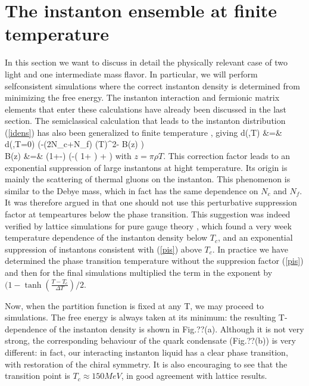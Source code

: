 \section{The instanton ensemble at finite temperature}

  In this section we want to discuss in detail the physically
relevant case of two light and one intermediate mass flavor. In
particular, we will perform selfconsistent simulations where the
correct instanton density is determined from minimizing the free
energy. The instanton interaction and fermionic matrix elements
that enter these calculations have already been discussed in the
last section. The semiclassical calculation that leads to the
instanton distribution (\ref{idens}) has also been generalized to
finite temperature \cite{PY_80}, giving
\be
\label{pis}
  d(\rho,T) &=& d(\rho,T=0) \exp(-(2N_c+N_f)
    (\pi\rho T)^2- B(z) ) \\
   B(z) &=& \left(1+-\right)
    \left(-\log \left( 1+ \right)
    +  \right) \nonumber
\ee
with $z=\pi\rho T$. This correction factor leads to an exponential
suppression of large instantons at hight temperature. Its origin
is mainly the scattering of thermal gluons on the instanton. This
phenomenon is similar to the Debye mass, which in fact has the same
dependence on $N_c$ and $N_f$. It was therefore argued in \cite{SV_94}
that one should not use this perturbative suppression factor at
tempeartures below the phase transition. This suggestion was indeed
verified by lattice simulations for pure gauge theory \cite{CS_95},
which found a very week temperature dependence of the instanton
density below $T_c$, and an exponential suppression of instantons
consistent with (\ref{pis}) above $T_c$. In practice we have determined
the phase transition temperature without the suppresion factor
(\ref{pis}) and then for the final simulations multiplied the
term in the exponent by $(1-\tanh(\frac{T-T_c}{\Delta T})/2$.


   Now, when the partition function is fixed
   at any T, we may proceed to simulations. The free energy is always
taken at its minimum:
 the resulting T-dependence of the instanton density is shown in Fig.??(a).
Although it is not very strong, the corresponding behaviour of the quark
condensate (Fig.??(b)) is very different: in fact, our interacting instanton
liquid has a clear phase transition, with restoration of the chiral symmetry.
It is also encouraging to see that the transition point is
$T_c\approx 150 MeV$, in good agreement with lattice results.



